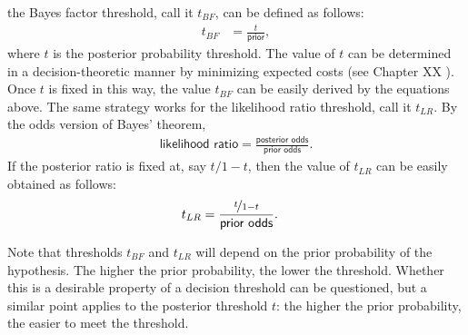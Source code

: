 \documentclass[
  10pt,
  dvipsnames,enabledeprecatedfontcommands]{scrartcl}
\begin{document}
\noindent the Bayes factor threshold, call it \(t_{BF}\), can be defined
as follows: \begin{align*}t_{BF} & = \frac{t}{\textsf{prior}},
\end{align*} where \(t\) is the posterior probability threshold. The
value of \(t\) can be determined in a decision-theoretic manner by
minimizing expected costs (see Chapter XX
). Once \(t\) is fixed in this way, the
value \(t_{BF}\) can be easily derived by the equations above. The same
strategy works for the likelihood ratio threshold, call it \(t_{LR}\).
By the odds version of Bayes' theorem,
\begin{align*}\textsf{likelihood ratio}=\frac{\textsf{posterior odds}}{\textsf{prior odds}}.
\end{align*} If the posterior ratio is fixed at, say \(t/1-t\), then the
value of \(t_{LR}\) can be easily obtained as follows:
\begin{align*}t_{LR} & = \frac{\nicefrac{t}{1-t}}{\textsf{prior odds}}.
\end{align*}

\noindent Note that thresholds \(t_{BF}\) and \(t_{LR}\) will depend on
the prior probability of the hypothesis. The higher the prior
probability, the lower the threshold. Whether this is a desirable
property of a decision threshold can be questioned, but a similar point
applies to the posterior threshold \(t\): the higher the prior
probability, the easier to meet the threshold.
\end{document}
